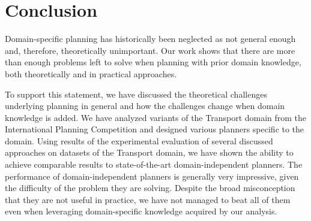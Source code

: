 \chapter*{Conclusion}

Domain-specific planning has historically been neglected as not general enough
and, therefore, theoretically unimportant.
Our work shows that there are more than enough problems
left to solve when planning with prior domain knowledge,
both theoretically and in practical approaches.

To support this statement,
we have discussed the theoretical challenges underlying
planning in general and how the challenges change when
domain knowledge is added.
We have analyzed variants of the Transport domain from the International Planning Competition
and designed various planners specific to the domain.
Using results of the experimental evaluation of several discussed approaches  on datasets of the Transport domain, we have shown the ability to achieve comparable results to state-of-the-art domain-independent planners.
The performance of domain-independent planners is generally very impressive, given the difficulty of the problem they are solving. Despite the broad misconception that they are not useful in practice,
we have not managed to beat all of them even when leveraging domain-specific knowledge acquired by our analysis.

